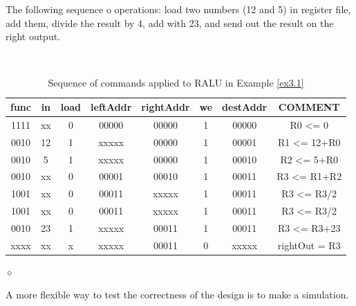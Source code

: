 \begin{exemplu}\label{ex3.1}
The following sequence o operations: load two numbers (12 and 5) in register file, add them, divide the result by 4, add with 23, and send out the result on the right output.


\begin{table}[H]
  \begin{center}
    \caption{Sequence of commands applied to RALU in Example \ref{ex3.1}}
    \label{raluSeq}
    \vspace{2mm}
    {\tt
    \begin{tabular}{|c|c|c|c|c|c|c||c|}
    \hline
    func &  in & load & leftAddr & rightAddr & we & destAddr & COMMENT          \\ \hline \hline
    1111 &  xx &  0   &  00000   &  00000    & 1  &  00000   & R0 <= 0          \\ \hline
    0010 &  12 &  1   &  xxxxx   &  00000    & 1  &  00001   & R1 <= 12+R0      \\ \hline
    0010 &   5 &  1   &  xxxxx   &  00000    & 1  &  00010   & R2 <= 5+R0       \\ \hline
    0010 &  xx &  0   &  00001   &  00010    & 1  &  00011   & R3 <= R1+R2      \\ \hline
    1001 &  xx &  0   &  00011   &  xxxxx    & 1  &  00011   & R3 <= R3/2       \\ \hline
    1001 &  xx &  0   &  00011   &  xxxxx    & 1  &  00011   & R3 <= R3/2       \\ \hline
    0010 &  23 &  1   &  xxxxx   &  00011    & 1  &  00011   & R3 <= R3+23      \\ \hline
    xxxx &  xx &  x   &  xxxxx   &  00011    & 0  &  xxxxx   & rightOut = R3    \\ \hline
 \end{tabular}
 }
  \end{center}
\end{table}

$\diamond$
\end{exemplu}


A more flexible way to test the correctness of the design is to make a simulation.

